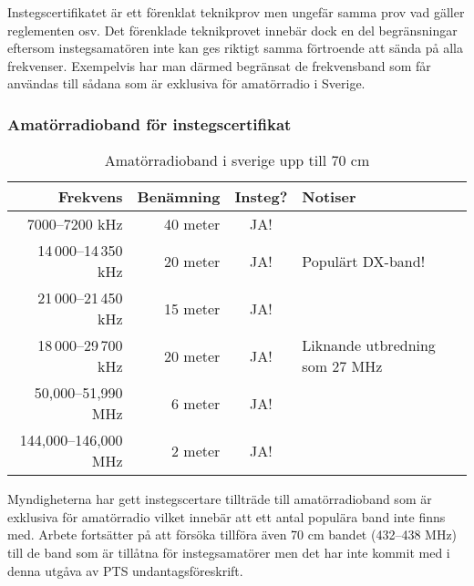 Instegscertifikatet är ett förenklat teknikprov men ungefär samma prov vad
gäller reglementen osv. Det förenklade teknikprovet innebär dock en del
begränsningar eftersom instegsamatören inte kan ges riktigt samma förtroende
att sända på alla frekvenser. Exempelvis har man därmed begränsat de
frekvensband som får användas till sådana som är exklusiva för amatörradio i
Sverige. 

\subsubsection{Amatörradioband för instegscertifikat}

\begin{table}[H]
	\centering
	\begin{tabular}{rrcl}
		   \textbf{Frekvens} & \textbf{Benämning} & \textbf{Insteg?} & \textbf{Notiser}               \\ \hline
		      7000--7200 kHz &           40 meter &       JA!        &                                \\
		14\,000--14\,350 kHz &           20 meter &       JA!        & Populärt DX-band!              \\
		21\,000--21\,450 kHz &           15 meter &       JA!        &                                \\
		18\,000--29\,700 kHz &           20 meter &       JA!        & Liknande utbredning som 27 MHz \\
		  50,000--51,990 MHz &            6 meter &       JA!        &                                \\
		144,000--146,000 MHz &            2 meter &       JA!        &
	\end{tabular}
	\caption{Amatörradioband i sverige upp till 70 cm}
\end{table}

Myndigheterna har gett instegscertare tillträde till amatörradioband som är
exklusiva för amatörradio vilket innebär att ett antal populära band inte
finns med. Arbete fortsätter på att försöka tillföra även 70 cm bandet
(432--438 MHz) till de band som är tillåtna för instegsamatörer men det har
inte kommit med i denna utgåva av PTS undantagsföreskrift. 
